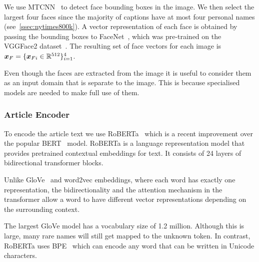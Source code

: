 We use MTCNN~\cite{Zhang2016JointFD} to detect face bounding boxes in the
image. We then select the largest four faces since the majority of captions
have at most four personal names (see~\ref{ssec:nytimes800k}). A vector
representation of each face is obtained by passing the bounding boxes to
FaceNet~\cite{Schroff2015FaceNetAU}, which was pre-trained on the VGGFace2
dataset~\cite{Cao2017VGGFace2AD}. The resulting set of face vectors for each
image is $\bm{x}_{F} = \{\bm{x}_{Fi} \in \mathbb{R}^{512}\}_{i=1}^4$.

Even though the faces are extracted from the image it is useful to consider
them as an input domain that is separate to the image. This is because
specialised models are needed to make full use of them.



\subsubsection{Article Encoder}

To encode the article text we use RoBERTa~\cite{Liu2019RoBERTaAR} which is a
recent improvement over the popular BERT~\cite{Devlin2019BERT} model.
RoBERTa is a language representation model that provides pretrained contextual
embeddings for text. It consists of 24 layers of bidirectional transformer
blocks.

Unlike GloVe~\cite{Pennington2014Glove} and word2vec
\cite{Mikolov2013DistributedRO} embeddings, where each word has exactly one
representation, the bidirectionality and the attention mechanism in the
transformer allow a word to have different vector representations depending on
the surrounding context.

The largest GloVe model has a vocabulary size of 1.2 million. Although this is
large, many rare names will still get mapped to the unknown token. In contrast,
RoBERTa uses BPE~\cite{Sennrich2015NeuralMT,Radford2019LanguageMA} which can
encode any word that can be written in Unicode characters.

